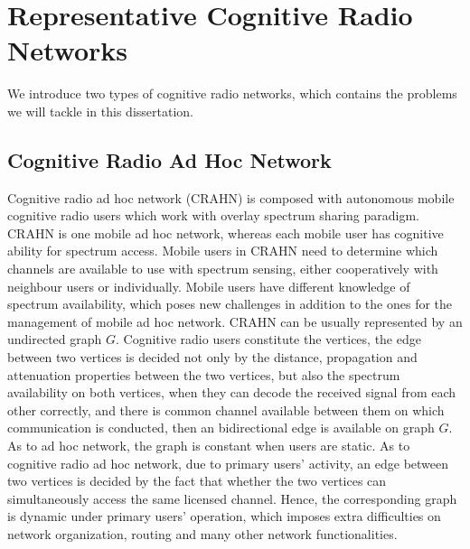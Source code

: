 \section{Representative Cognitive Radio Networks}
We introduce two types of cognitive radio networks, which contains the problems we will tackle in this dissertation.

\subsection{Cognitive Radio Ad Hoc Network}


Cognitive radio ad hoc network (\gls{CRAHN}) is composed with autonomous mobile cognitive radio users which work with overlay spectrum sharing paradigm.
CRAHN is one mobile ad hoc network, whereas each mobile user has cognitive ability for spectrum access.
Mobile users in CRAHN need to determine which channels are available to use with spectrum sensing, either cooperatively with neighbour users or individually.
Mobile users have different knowledge of spectrum availability, which poses new challenges in addition to the ones for the management of mobile ad hoc network.
CRAHN can be usually represented by an undirected graph $G$.
Cognitive radio users constitute the vertices, the edge between two vertices is decided not only by the distance, propagation and attenuation properties between the two vertices, but also the spectrum availability on both vertices, \ie when they can decode the received signal from each other correctly, and there is common channel available between them on which communication is conducted, then an bidirectional edge is available on graph $G$.
As to ad hoc network, the graph is constant when users are static.
As to cognitive radio ad hoc network, due to primary users' activity, an edge between two vertices is decided by the fact that whether the two vertices can simultaneously access the same licensed channel.
Hence, the corresponding graph is dynamic under primary users' operation, which imposes extra difficulties on network organization, routing and many other network functionalities.

